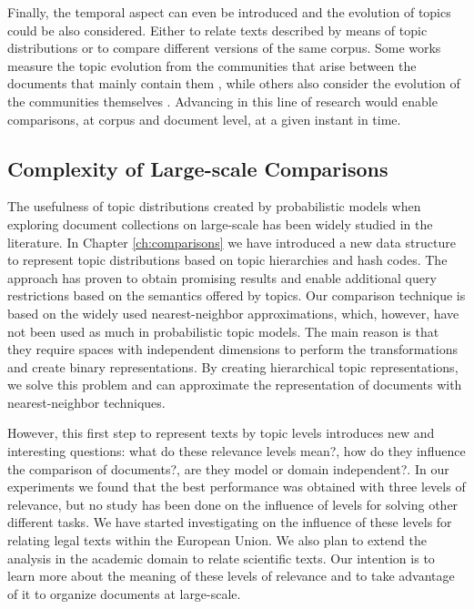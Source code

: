Finally, the temporal aspect can even be introduced and the evolution of topics could be also considered. Either to relate texts described by means of topic distributions or to compare different versions of the same corpus. Some works measure the topic evolution from the communities that arise between the documents that mainly contain them \citep{Gruhl2004, Li2010, Kleinberg1999}, while others also consider the evolution of the communities themselves \citep{Li2012, Nguyen2014DynamicSC, Leydesdorff2012StatisticsFT, prabhakaran-etal-2016-predicting, Zijun2018}. Advancing in this line of research would enable comparisons, at corpus and document level, at a given instant in time. 



\subsection{Complexity of Large-scale Comparisons} 

The usefulness of topic distributions created by probabilistic models when exploring document collections on large-scale has been widely studied in the literature. In Chapter \ref{ch:comparisons} we have introduced a new data structure to represent topic distributions based on topic hierarchies and hash codes. The approach has proven to obtain promising results and enable additional query restrictions based on the semantics offered by topics. Our comparison technique is based on the widely used nearest-neighbor approximations, which, however, have not been used as much in probabilistic topic models. The main reason is that they require spaces with independent dimensions to perform the transformations and create binary representations. By creating hierarchical topic representations, we solve this problem and can approximate the representation of documents with nearest-neighbor techniques.

However, this first step to represent texts by topic levels introduces new and interesting questions: what do these relevance levels mean?, how do they influence the comparison of documents?, are they model or domain independent?. In our experiments we found that the best performance was obtained with three levels of relevance, but no study has been done on the influence of levels for solving other different tasks. We have started investigating on the influence of these levels for relating legal texts within the European Union. We also plan to extend the analysis in the academic domain to relate scientific texts. Our intention is to learn more about the meaning of these levels of relevance and to take advantage of it to organize documents at large-scale.



